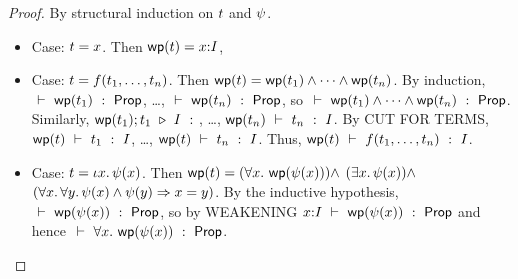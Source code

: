 \documentclass[11pt]{article}
\begin{document}
\begin{proof}
  \raggedright
  By structural induction on $t$ and $\psi$.
  \begin{itemize}
  \item Case: $t = x$.  Then $\mathop{\mathsf{wp}}(t) = x{:}I$,
  \item Case: $t = f({t}_1,\ldots,{t}_{n})$.  Then $\mathop{\mathsf{wp}}(t) =
    \mathop{\mathsf{wp}}(t_1) \wedge \cdots \wedge \mathop{\mathsf{wp}}(t_n)$.  By induction,
    $\ \vdash\ \mathop{\mathsf{wp}}(t_1)\ :\ \mathsf{Prop}$, \ldots, $\ \vdash\ \mathop{\mathsf{wp}}(t_n)\ :\ \mathsf{Prop}$, so
    $\ \vdash\ \mathop{\mathsf{wp}}(t_1) \wedge \cdots \wedge \mathop{\mathsf{wp}}(t_n)\ :\ \mathsf{Prop}$.
    Similarly, $\wfterm{\wp{\t_1}}{\t_1}{\I}$, \ldots,
    $\mathop{\mathsf{wp}}(t_n)\ \vdash\ t_n\ :\ I$.  By CUT FOR TERMS,
    $\mathop{\mathsf{wp}}(t)\ \vdash\ t_1\ :\ I$, \ldots,
    $\mathop{\mathsf{wp}}(t)\ \vdash\ t_n\ :\ I$.  Thus,
    $\mathop{\mathsf{wp}}(t)\ \vdash\ f({t}_1,\ldots,{t}_{n})\ :\ I$.
  \item Case: $t = \iota x.\, \psi(x)$. Then
    $\mathop{\mathsf{wp}}(t) = 
       (\forall x.\, \mathop{\mathsf{wp}}(\psi(x))) \wedge$
       $(\exists x.\, \psi(x)) \wedge$
       $(\forall x.\, \forall y.\, \psi(x) \wedge \psi(y) \Rightarrow x=y)$.
    By the inductive hypothesis, $\ \vdash\ \mathop{\mathsf{wp}}(\psi(x))\ :\ \mathsf{Prop}$, so 
    by WEAKENING $x{:}I\ \vdash\ \mathop{\mathsf{wp}}(\psi(x))\ :\ \mathsf{Prop}$ and hence
    $\ \vdash\ \forall x.\, \mathop{\mathsf{wp}}(\psi(x))\ :\ \mathsf{Prop}$.
 

  \end{itemize}
\end{proof}
\end{document}
